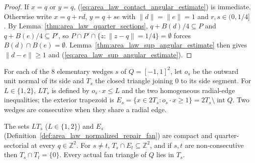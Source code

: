 \begin{proof}
    \leanok
    If $x=q$ or $y=q$, (\ref{eq:area_law_contact_angular_estimate}) is immediate. Otherwise write
    $x=q+rd$, $y=q+se$ with $\|d\|=\|e\|=1$ and $r,s\in(0,1/4]$. By Lemma~\ref{thm:area_law_quarter_sections},
    $q+B(d)/4\subseteq P$ and $q+B(e)/4\subseteq P'$, so $P\cap P'\cap\{z:\|z-q\|=1/4\}=\emptyset$
    forces $B(d)\cap B(e)=\emptyset$. Lemma~\ref{thm:area_law_sup_angular_estimate} then gives
    $\|d-e\|\ge1$ and (\ref{eq:area_law_sup_angular_estimate}).
\end{proof}

\begin{definition}
    \label{def:area_law_normalized_repair_fan}
    \leanok
    For each of the $8$ elementary wedges $s$ of $Q=[-1,1]^2$, let $o_s$ be the outward unit
    normal of its side and $T_s$ the closed triangle joining $0$ to its side segment.
    For $L\in\{1,2\}$, $LT_s$ is defined by $o_s\cdot x\le L$ and the two homogeneous radial-edge
    inequalities; the exterior trapezoid is $E_s=\{x\in2T_s:o_s\cdot x\ge1\}=2T_s\setminus\operatorname{int}Q$.
    Two wedges are consecutive when they share a radial edge.
\end{definition}

\begin{lemma}
    \label{thm:area_law_normalized_fan_contacts}
    \leanok
    The sets $LT_s$ ($L\in\{1,2\}$) and $E_s$ (Definition~\ref{def:area_law_normalized_repair_fan})
    are compact and quarter-sectorial at every $q\in\mathbb Z^2$. For $s\ne t$,
    $T_s\cap E_t\subseteq\mathbb Z^2$, and if $s,t$ are non-consecutive then $T_s\cap T_t=\{0\}$.
    Every actual fan triangle of $Q$ lies in $T_s$.
\end{lemma}

